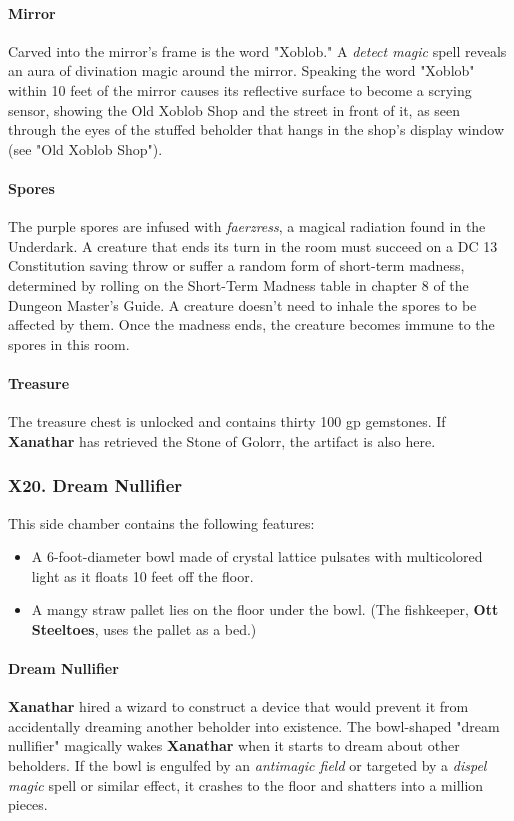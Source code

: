 \documentclass[10pt,a4paper,twoside,twocolumn,openany,nodeprecatedcode]{dndbook}
\begin{document}
\paragraph{Mirror}
Carved into the mirror's frame is the word "Xoblob." A \textit{detect magic} spell reveals an aura of divination magic around the mirror. Speaking the word "Xoblob" within 10 feet of the mirror causes its reflective surface to become a scrying sensor, showing the Old Xoblob Shop and the street in front of it, as seen through the eyes of the stuffed beholder that hangs in the shop's display window (see "Old Xoblob Shop").
\paragraph{Spores}
The purple spores are infused with \textit{faerzress}, a magical radiation found in the Underdark. A creature that ends its turn in the room must succeed on a DC 13 Constitution saving throw or suffer a random form of short-term madness, determined by rolling on the Short-Term Madness table in chapter 8 of the Dungeon Master's Guide. A creature doesn't need to inhale the spores to be affected by them. Once the madness ends, the creature becomes immune to the spores in this room.
\paragraph{Treasure}
The treasure chest is unlocked and contains thirty 100 gp gemstones. If \textbf{Xanathar} has retrieved the Stone of Golorr, the artifact is also here.
\subsubsection{X20. Dream Nullifier}
This side chamber contains the following features:
\begin{itemize}

\item A 6-foot-diameter bowl made of crystal lattice pulsates with multicolored light as it floats 10 feet off the floor.
\item A mangy straw pallet lies on the floor under the bowl. (The fishkeeper, \textbf{Ott Steeltoes}, uses the pallet as a bed.)
\end{itemize}


\paragraph{Dream Nullifier}
\textbf{Xanathar} hired a wizard to construct a device that would prevent it from accidentally dreaming another beholder into existence. The bowl-shaped "dream nullifier" magically wakes \textbf{Xanathar} when it starts to dream about other beholders. If the bowl is engulfed by an \textit{antimagic field} or targeted by a \textit{dispel magic} spell or similar effect, it crashes to the floor and shatters into a million pieces.
\end{document}
